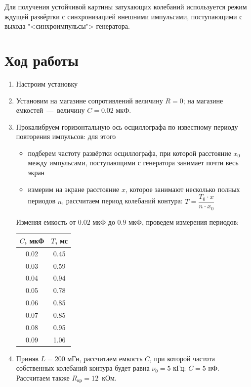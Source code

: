 \documentclass[a4paper, 12pt]{article}
\begin{document}
    Для получения устойчивой картины затухающих колебаний используется
    режим ждущей развёртки с синхронизацией внешними импульсами,
    поступающими с выхода "<синхроимпульсы"> генератора.

    \section*{Ход работы}

    \begin{enumerate}
        \item Настроим установку
        \item Установим на магазине сопротивлений величину $R = 0$; на магазине емкостей~---~величину $C = 0.02$ мкФ.
        \item Прокалибруем горизонтальную ось осциллографа по известному периоду повторения импульсов: для этого
        \begin{itemize}
            \item подберем частоту развёртки осциллографа, при которой расстояние $x_0$ между импульсами, поступающими с генератора занимает почти весь экран
            \item измерим на экране расстояние $x$, которое занимают несколько полных периодов $n$, рассчитаем период колебаний контура: $T = \dfrac{T_0 \cdot x}{n \cdot x_0}$
        \end{itemize}
        Изменяя емкость от $0.02$ мкФ до $0.9$ мкФ, проведем измерения периодов:
        
        \begin{tabular}{|c|c|}\hline
            $C$, мкФ & $T$, мс \\ \hline
            0.02 & 0.45 \\ \hline
            0.03 & 0.59 \\ \hline
            0.04 & 0.94 \\ \hline
            0.05 & 0.78 \\ \hline
            0.06 & 0.85 \\ \hline
            0.07 & 0.85 \\ \hline
            0.08 & 0.95 \\ \hline
            0.09 & 1.06 \\ \hline
        \end{tabular}

        \item Приняв $L = 200$ мГн, рассчитаем емкость $C$, при которой частота собственных колебаний контура будет равна $\nu_0 = 5$ кГц: $C = 5$ нФ.
        Рассчитаем также $R_{кр} = 12$~кОм.


\end{enumerate}
\end{document}
